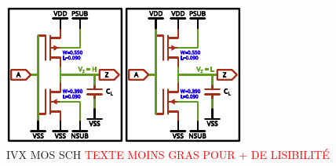
\begin{figure}[h]
	\centering
	\includegraphics[width=\columnwidth]{./figures/IVX4.pdf}
	\caption{IVX MOS SCH \textcolor{red}{TEXTE MOINS GRAS POUR + DE LISIBILITÉ}}
	\label{ivxbufmos}
\end{figure}
